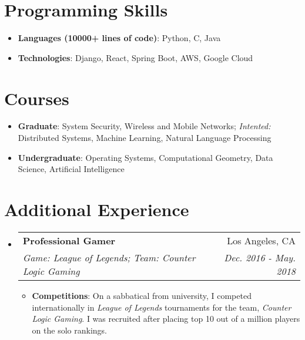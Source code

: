 \documentclass[letterpaper,11pt]{article}
\makeatletter
\newcommand{\resumeItem}[2]{
  \item\small{
    \textbf{#1}{: #2 \vspace{-2pt}}
  }
}
\newcommand{\resumeSubheading}[4]{
  \vspace{-1pt}\item
    \begin{tabular*}{0.97\textwidth}[t]{l@{\extracolsep{\fill}}r}
      \textbf{#1} & #2 \\
      \textit{\small#3} & \textit{\small #4} \\
    \end{tabular*}\vspace{-5pt}
}
\newcommand{\resumeSubItem}[2]{\resumeItem{#1}{#2}\vspace{-4pt}}
\newcommand{\resumeSubHeadingListStart}{\begin{itemize}[leftmargin=*]}
\newcommand{\resumeSubHeadingListEnd}{\end{itemize}}
\newcommand{\resumeItemListStart}{\begin{itemize}}
\newcommand{\resumeItemListEnd}{\end{itemize}\vspace{-5pt}}
\makeatother
\begin{document}
\section{Programming Skills}
  \resumeSubHeadingListStart
    \resumeSubItem{Languages (10000+ lines of code)}
      {Python, C, Java}
    \resumeSubItem{Technologies}
      {Django, React, Spring Boot, AWS, Google Cloud}
  \resumeSubHeadingListEnd


\section{Courses}
  \resumeSubHeadingListStart
    \resumeSubItem{Graduate}
      {System Security, Wireless and Mobile Networks; \textit{Intented:} Distributed Systems, Machine Learning, Natural
      Language Processing}
    \resumeSubItem{Undergraduate}
      {Operating Systems, Computational Geometry, Data Science, Artificial Intelligence}
  \resumeSubHeadingListEnd

\section{Additional Experience}
  \resumeSubHeadingListStart
    \resumeSubheading
      {Professional Gamer}{Los Angeles, CA}
      {Game: League of Legends; Team: Counter Logic Gaming}{Dec. 2016 - May. 2018}
      \resumeItemListStart
        \resumeItem{Competitions}
          {On a sabbatical from university, I competed internationally in
          \textit{League of Legends} tournaments for the team, \textit{Counter
          Logic Gaming}. I was recruited after placing top 10 out of a million
          players on the solo rankings.}
      \resumeItemListEnd
      \vspace{-5pt}
  \resumeSubHeadingListEnd
\end{document}
